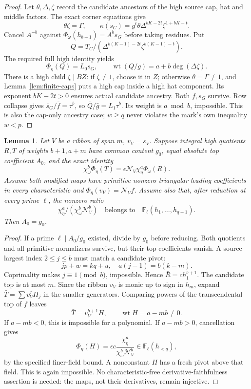 \documentclass[11pt,a4paper]{amsart}
\numberwithin{equation}{section}
\theoremstyle{plain}
\newtheorem{lemma}[theorem]{Lemma}
\theoremstyle{definition}
\begin{document}
\begin{proof}
Let \(\theta,\Delta,\zeta\) record the candidate ancestors of the high source cap, hat and middle factors.  The exact corner equations give
\[
 \theta\zeta=\Gamma,\qquad
 \kappa(s_C)=g^t\theta\Delta^{bK-2t}\zeta^{1+bK-t}.
\]
Cancel \(A^{-b}\) against \(\Phi_\omega(h_{b+1})=A^bs_G\) before taking residues.  Put
\[
 Q=T_C/(\Delta^{b(K-1)-2t}\zeta^{b(K-1)-t}).
\]
The required full high identity yields
\[
 \Phi_\eta(Q)=L_0s_G,\qquad
 \operatorname{wt}(Q/g)=a+b\deg(\Delta\zeta).
\]
There is a high child \(\xi\mid BZ\): if \(\zeta\ne1\), choose it in \(Z\); otherwise \(\theta=\Gamma\ne1\), and Lemma~\ref{lem:finite-caps} puts a high cap inside a high hat component.  Its exponent \(bK-2t>0\) ensures actual candidate ancestry.  Both \(f,s_G\) survive.  Row collapse gives \(\bar s_G/\bar f=\tau^b\), so \(\bar Q/\bar g=L_1\tau^b\).  Its weight is \(a\bmod b\), impossible.  This is also the cap-only ancestry case; \(w\ge q\) never violates the mark's own inequality \(w<p\).
\end{proof}

\begin{lemma}\label{lem:modular-saturation}
Let \(V\) be a ribbon of span \(m\), \(v_V=s_V\).  Suppose integral high quotients \(R,T\) of weights \(b+1,a+m\) have common content \(g_0\), equal absolute top coefficient \(A_0\), and the exact identity
\[
 \chi_\omega^b\Phi_\eta(T)
 =\epsilon\mathcal N_V\chi_\eta^a\Phi_\omega(R).
\]
Assume both modified maps have primitive nonzero triangular leading coefficients in every characteristic and \(\Phi_\eta(v_V)=\mathcal N_Vf\).  Assume also that, after reduction at every prime \(\ell\), the nonzero ratio
\[
 \chi_\eta^a/(\chi_\omega^b\mathcal N_V^b)
 \quad\text{belongs to}\quad\mathbb F_\ell(h_1,\ldots,h_{q-1}).
\]
Then \(A_0=g_0\).
\end{lemma}
\begin{proof}
If a prime \(\ell\mid A_0/g_0\) existed, divide by \(g_0\) before reducing.  Both quotients and all primitive normalizers survive, but their top coefficients vanish.  A source largest index \(2\le j\le b\) must match a candidate pivot:
\[
 jp+w=kq+u,\quad a(j-1)=b(k-m).
\]
Coprimality makes \(j\equiv1\pmod b\), impossible.  Hence \(\bar R=c h_1^{b+1}\).  The candidate top is at most \(m\).  Since the ribbon \(v_V\) is monic up to sign in \(h_m\), expand \(\bar T=\sum v_V^jH_j\) in the smaller generators.  Comparing powers of the transcendental top of \(f\) leaves
\[
 \bar T=v_V^{b+1}H,\qquad \operatorname{wt}H=a-mb\ne0.
\]
If \(a-mb<0\), this is impossible for a polynomial.  If \(a-mb>0\), cancellation gives
\[
 \Phi_\eta(H)=\epsilon c\frac{\chi_\eta^a}
 {\chi_\omega^b\mathcal N_V^b}\in\mathbb F_\ell(h_{<q}),
\]
by the specified finer-field bound.  A nonconstant \(H\) has a fresh pivot above that field.  This is again impossible.  No characteristic-free derivative-faithfulness assertion is needed: the maps, not their derivatives, remain injective.
\end{proof}
\end{document}

